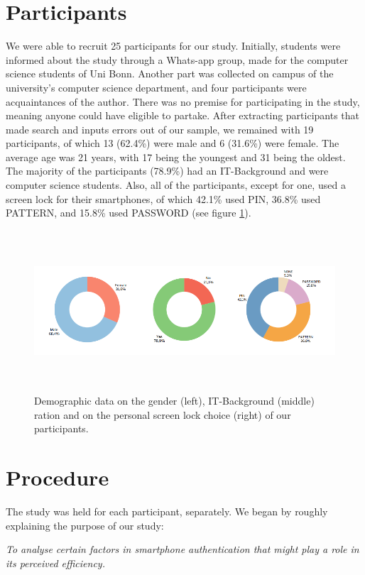 \section{Participants}

We were able to recruit 25 participants for our study. Initially, students were informed about the study through a Whats-app group, made for the computer science students of Uni Bonn. Another part was collected on campus of the university's computer science department, and four participants were acquaintances of the author. There was no premise for participating in the study, meaning anyone could have eligible to partake. After extracting participants that made search and inputs errors out of our sample, we remained with 19 participants, of which 13 (62.4\%) were male and 6 (31.6\%) were female. The average age was 21 years, with 17 being the youngest and 31 being the oldest. The majority of the participants (78.9\%) had an IT-Background and were computer science students. Also, all of the participants, except for one, used a screen lock for their smartphones, of which 42.1\% used PIN, 36.8\% used PATTERN, and 15.8\% used PASSWORD (see figure \ref{fig:demo}).  

\begin{figure}[t!]
\centering
\includegraphics[width=16cm, height=6cm]{Chapters/graphics/Demos.PNG}
\caption{Demographic data on the gender (left), IT-Background (middle) ration and on the personal screen lock choice (right) of our participants.}
\label{fig:demo}
\end{figure}

\section{Procedure}
The study was held for each participant, separately. We began by roughly explaining the purpose of our study:

\begin{center}
\textit{To analyse certain factors in smartphone authentication that might play a role in its perceived efficiency.}    
\end{center}

